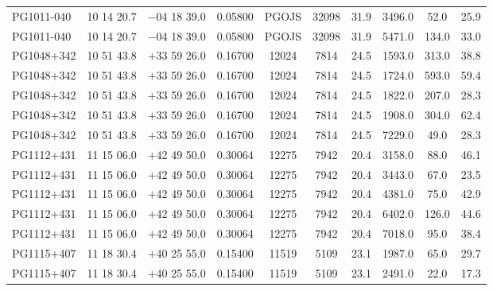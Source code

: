 \begin{landscape}
\begin{center}
\begin{longtable}{l c c c c c c c c c}
PG1011-040  &              10 14 20.7  &         $-$04 18 39.0  &       0.05800  & PGOJS  &   32098  &      31.9  &      3496.0  &  52.0  &   25.9  \\
PG1011-040  &              10 14 20.7  &         $-$04 18 39.0  &       0.05800  & PGOJS  &   32098  &      31.9  &      5471.0  &  134.0  &  33.0  \\
PG1048+342  &              10 51 43.8  &         $+$33 59 26.0  &       0.16700  & 12024  &   7814  &       24.5  &      1593.0  &  313.0  &  38.8  \\
PG1048+342  &              10 51 43.8  &         $+$33 59 26.0  &       0.16700  & 12024  &   7814  &       24.5  &      1724.0  &  593.0  &  59.4  \\
PG1048+342  &              10 51 43.8  &         $+$33 59 26.0  &       0.16700  & 12024  &   7814  &       24.5  &      1822.0  &  207.0  &  28.3  \\
PG1048+342  &              10 51 43.8  &         $+$33 59 26.0  &       0.16700  & 12024  &   7814  &       24.5  &      1908.0  &  304.0  &  62.4  \\
PG1048+342  &              10 51 43.8  &         $+$33 59 26.0  &       0.16700  & 12024  &   7814  &       24.5  &      7229.0  &  49.0  &   28.3  \\
PG1112+431  &              11 15 06.0  &         $+$42 49 50.0  &       0.30064  & 12275  &   7942  &       20.4  &      3158.0  &  88.0  &   46.1  \\
PG1112+431  &              11 15 06.0  &         $+$42 49 50.0  &       0.30064  & 12275  &   7942  &       20.4  &      3443.0  &  67.0  &   23.5  \\
PG1112+431  &              11 15 06.0  &         $+$42 49 50.0  &       0.30064  & 12275  &   7942  &       20.4  &      4381.0  &  75.0  &   42.9  \\
PG1112+431  &              11 15 06.0  &         $+$42 49 50.0  &       0.30064  & 12275  &   7942  &       20.4  &      6402.0  &  126.0  &  44.6  \\
PG1112+431  &              11 15 06.0  &         $+$42 49 50.0  &       0.30064  & 12275  &   7942  &       20.4  &      7018.0  &  95.0  &   38.4  \\
PG1115+407  &              11 18 30.4  &         $+$40 25 55.0  &       0.15400  & 11519  &   5109  &       23.1  &      1987.0  &  65.0  &   29.7  \\
PG1115+407  &              11 18 30.4  &         $+$40 25 55.0  &       0.15400  & 11519  &   5109  &       23.1  &      2491.0  &  22.0  &   17.3  \\

\end{longtable}
\end{center}
\end{landscape}
